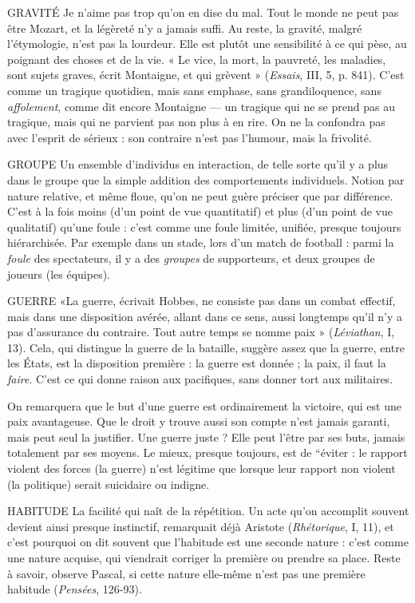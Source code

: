 GRAVITÉ Je n’aime pas trop qu’on en dise du mal. Tout le monde ne peut
pas être Mozart, et la légèreté n’y a jamais suffi. Au reste, la gravité,
malgré l’étymologie, n’est pas la lourdeur. Elle est plutôt une sensibilité à
ce qui pèse, au poignant des choses et de la vie. « Le vice, la mort, la pauvreté,
les maladies, sont sujets graves, écrit Montaigne, et qui grèvent » ({\it Essais}, III, 5,
p. 841). C’est comme un tragique quotidien, mais sans emphase, sans grandiloquence,
sans {\it affolement}, comme dit encore Montaigne — un tragique qui ne
se prend pas au tragique, mais qui ne parvient pas non plus à en rire. On ne la
confondra pas avec l’esprit de sérieux : son contraire n’est pas l'humour, mais
la frivolité.

GROUPE Un ensemble d'individus en interaction, de telle sorte qu'il y a
plus dans le groupe que la simple addition des comportements
individuels. Notion par nature relative, et même floue, qu’on ne peut guère
préciser que par différence. C’est à la fois moins (d’un point de vue quantitatif)
et plus (d’un point de vue qualitatif) qu’une foule : c’est comme une foule
limitée, unifiée, presque toujours hiérarchisée. Par exemple dans un stade, lors
d’un match de football : parmi la {\it foule} des spectateurs, il y a des {\it groupes} de supporteurs,
et deux groupes de joueurs (les équipes).

GUERRE «La guerre, écrivait Hobbes, ne consiste pas dans un combat
effectif, mais dans une disposition avérée, allant dans ce sens,
aussi longtemps qu’il n’y a pas d’assurance du contraire. Tout autre temps se
nomme paix » ({\it Léviathan}, I, 13). Cela, qui distingue la guerre de la bataille,
suggère assez que la guerre, entre les États, est la disposition première : la guerre
est donnée ; la paix, il faut la {\it faire}. C’est ce qui donne raison aux pacifiques,
sans donner tort aux militaires.

On remarquera que le but d’une guerre est ordinairement la victoire, qui
est une paix avantageuse. Que le droit y trouve aussi son compte n’est jamais
garanti, mais peut seul la justifier. Une guerre juste ? Elle peut l’être par ses
buts, jamais totalement par ses moyens. Le mieux, presque toujours, est de
“éviter : le rapport violent des forces (la guerre) n’est légitime que lorsque leur
rapport non violent (la politique) serait suicidaire ou indigne.

HABITUDE La facilité qui naît de la répétition. Un acte qu’on accomplit
souvent devient ainsi presque instinctif, remarquait déjà Aristote
({\it Rhétorique}, I, 11), et c’est pourquoi on dit souvent que l’habitude est une
seconde nature : c’est comme une nature acquise, qui viendrait corriger la première
ou prendre sa place. Reste à savoir, observe Pascal, si cette nature elle-même
n’est pas une première habitude ({\it Pensées}, 126-93).

